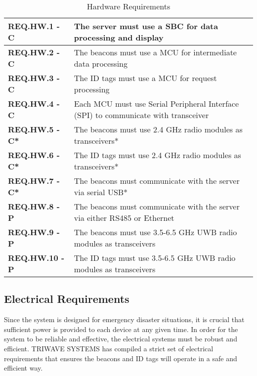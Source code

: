 \bigskip

\bgroup
\def\arraystretch{1.5}
\begin{table}[H]
\centering
\begin{tabular}{ | m{3.25cm} | m{12.5cm} |}
 \hline
 \textbf{REQ.HW.1 - C} & The server must use a \Gls{SBC} for data processing and display \\
\hline
 \textbf{REQ.HW.2 - C} & The beacons must use a MCU for intermediate data processing \\
\hline
 \textbf{REQ.HW.3 - C} & The ID tags must use a MCU for request processing \\
\hline
 \textbf{REQ.HW.4 - C} & Each MCU must use Serial Peripheral Interface (SPI) to communicate with transceiver \\
\hline
 \textbf{REQ.HW.5 - C*} & The beacons must use 2.4 GHz radio modules as transceivers* \\
\hline
 \textbf{REQ.HW.6 - C*} & The ID tags must use 2.4 GHz radio modules as transceivers*  \\
\hline
 \textbf{REQ.HW.7 - C*} & The beacons must communicate with the server via serial USB* \\
\hline
 \textbf{REQ.HW.8 - P} & The beacons must communicate with the server via either RS485 or Ethernet  \\
\hline
 \textbf{REQ.HW.9 - P} & The beacons must use 3.5-6.5 GHz UWB radio modules as transceivers \\
\hline
 \textbf{REQ.HW.10 - P} & The ID tags must use 3.5-6.5 GHz UWB radio modules as transceivers \\
\hline
\end{tabular}
\caption{Hardware Requirements}
\end{table}

\break
\subsection{Electrical Requirements}
Since the system is designed for emergency disaster situations, it is crucial that sufficient power is provided to each device at any given time. In order for the system to be reliable and effective, the electrical systems must be robust and efficient. TRIWAVE SYSTEMS has compiled a strict set of electrical requirements that ensures the beacons and ID tags will operate in a safe and efficient way.

\bigskip

